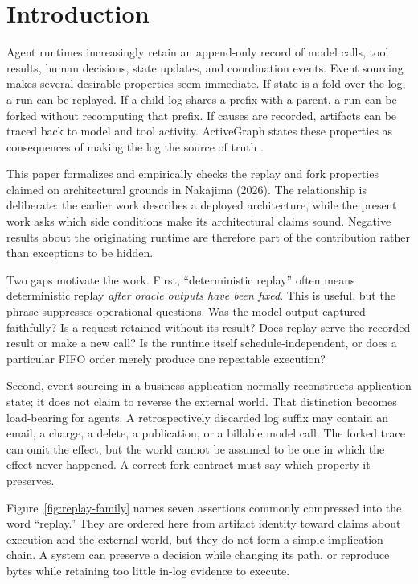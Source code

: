 \section{Introduction}

Agent runtimes increasingly retain an append-only record of model calls, tool
results, human decisions, state updates, and coordination events.  Event
sourcing makes several desirable properties seem immediate.  If state is a
fold over the log, a run can be replayed.  If a child log shares a prefix with a
parent, a run can be forked without recomputing that prefix.  If causes are
recorded, artifacts can be traced back to model and tool activity.  ActiveGraph
states these properties as consequences of making the log the source of truth
\cite{nakajima2026log}.

This paper formalizes and empirically checks the replay and fork properties
claimed on architectural grounds in Nakajima (2026).  The relationship is
deliberate: the earlier work describes a deployed architecture, while the
present work asks which side conditions make its architectural claims sound.
Negative results about the originating runtime are therefore part of the
contribution rather than exceptions to be hidden.

Two gaps motivate the work.  First, ``deterministic replay'' often means
deterministic replay \emph{after oracle outputs have been fixed}.  This is
useful, but the phrase suppresses operational questions.  Was the model output
captured faithfully?  Is a request retained without its result?  Does replay
serve the recorded result or make a new call?  Is the runtime itself
schedule-independent, or does a particular FIFO order merely produce one
repeatable execution?

Second, event sourcing in a business application normally reconstructs
application state; it does not claim to reverse the external world.  That
distinction becomes load-bearing for agents.  A retrospectively discarded log
suffix may contain an email, a charge, a delete, a publication, or a billable
model call.  The forked trace can omit the effect, but the world cannot be
assumed to be one in which the effect never happened.  A correct fork contract
must say which property it preserves.

Figure~\ref{fig:replay-family} names seven assertions commonly compressed into
the word ``replay.''  They are ordered here from artifact identity toward
claims about execution and the external world, but they do not form a simple
implication chain.  A system can preserve a decision while changing its path,
or reproduce bytes while retaining too little in-log evidence to execute.

